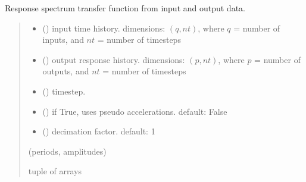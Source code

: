 \documentclass[letterpaper,10pt,english]{sphinxmanual}
\begin{document}
\begin{fulllineitems}
\label{\detokenize{library/mdof.transform:mdof.transform.response_transfer}}
\pysigstartsignatures
{}
\pysigstopsignatures
\sphinxAtStartPar
Response spectrum transfer function from input and output data.
\begin{quote}\begin{description}
\begin{itemize}
\item {} 
\sphinxAtStartPar
{} () \textendash{} input time history. dimensions: \((q,nt)\), where
\(q\) = number of inputs, and \(nt\) = number of timesteps

\item {} 
\sphinxAtStartPar
{} () \textendash{} output response history.
dimensions: \((p,nt)\), where \(p\) = number of outputs, and
\(nt\) = number of timesteps

\item {} 
\sphinxAtStartPar
{} () \textendash{} timestep.

\item {} 
\sphinxAtStartPar
{} (\sphinxstyleliteralemphasis{\sphinxupquote{, }}) \textendash{} if True, uses pseudo accelerations. default: False

\item {} 
\sphinxAtStartPar
{} (\sphinxstyleliteralemphasis{\sphinxupquote{, }}) \textendash{} decimation factor. default: 1

\end{itemize}

\sphinxAtStartPar
(periods, amplitudes)

\sphinxAtStartPar
tuple of arrays

\end{description}\end{quote}

\end{fulllineitems}
\end{document}
